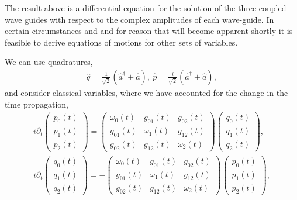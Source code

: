 \documentclass[9pt,twocolumn,twoside]{osajnl}
\begin{document}
The result above is a differential equation 
for the solution of the three coupled wave guides
with respect to the complex amplitudes of each 
wave-guide. In certain circumstances and and for 
reason that will become apparent shortly it is 
feasible to derive equations of motions 
for other sets of variables. 

We can use quadratures,
\begin{eqnarray}
\hat{q} = \frac{1}{\sqrt{2}} \left( \hat{a}^{\dagger} + \hat{a} \right), ~ 
\hat{p} = \frac{i}{\sqrt{2}} \left( \hat{a}^{\dagger} + \hat{a} \right),
\end{eqnarray}
and consider classical variables, where we have accounted for the change in the time propagation,
\begin{eqnarray}
	i \partial_t	
	\left( \begin{array}{c} 
		p_{0}(t) \\
		p_{1}(t) \\
		p_{2}(t)
	\end{array} \right) =
	\left( \begin{array}{ccc} 
		\omega_{0}(t)  & g_{01}(t) & g_{02}(t) \\
		g_{01}(t) & \omega_{1}(t) & g_{12}(t) \\
		g_{02}(t) & g_{12}(t) & \omega_{2}(t)
	\end{array} \right)
	\left( \begin{array}{c} 
		q_{0}(t) \\
		q_{1}(t) \\
		q_{2}(t)
	\end{array} \right) , \\
i \partial_t	
	\left( \begin{array}{c} 
		q_{0}(t) \\
		q_{1}(t) \\
		q_{2}(t)
	\end{array} \right) = -
	\left( \begin{array}{ccc} 
		\omega_{0}(t)  & g_{01}(t) & g_{02}(t) \\
		g_{01}(t) & \omega_{1}(t) & g_{12}(t) \\
		g_{02}(t) & g_{12}(t) & \omega_{2}(t)
	\end{array} \right)
	\left( \begin{array}{c} 
		p_{0}(t) \\
		p_{1}(t) \\
		p_{2}(t)
	\end{array} \right) ,
\end{eqnarray}
\end{document}
